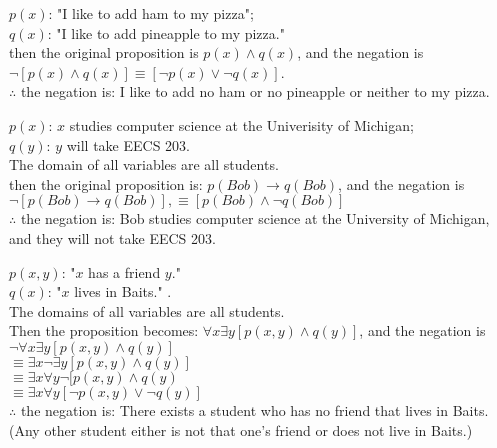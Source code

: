 \documentclass[12pt]{exam}
\begin{document}
\begin{solution}
\begin{qparts}
    \item 
 $p(x)$: "I like to add ham to my pizza"; \\$q(x)$: "I like to add pineapple to my pizza."\\
    then the original proposition is $p(x) \land q(x)$, and the negation is $\lnot [p(x) \land q(x)] \equiv [\lnot p(x) \lor \lnot q(x)]$. \\
    $\therefore$ the negation is: I like to add no ham or no pineapple or neither to my pizza.

    \item
    $p(x)$: $x$ studies computer science at the Univerisity of Michigan;\\
    $q(y)$: $y$ will take EECS 203. \\
    The domain of all variables are all students. \\
    then the original proposition is: $p(Bob) \rightarrow q(Bob)$, and the negation is $\lnot [p(Bob) \rightarrow q(Bob)], \equiv [p(Bob) \land \lnot q(Bob)]$
\\$\therefore$ the negation is: Bob studies computer science at the University of Michigan, and they will not take EECS 203.
    

    \item $p(x,y)$: "$x$ has a friend $y$."\\
   $q(x)$: "$x$ lives in Baits." .\\
   The domains of all variables are all students.\\
   Then the proposition becomes: 
   $\forall x \exists y [p(x,y) \land q(y)]$, and the negation is $\lnot \forall x \exists y [p(x,y) \land q(y)]$ \\
   $\equiv \exists x \lnot \exists y [p(x,y) \land q(y)]$ \\
   $\equiv \exists x \forall y \lnot [p(x,y) \land q(y)$ \\
   $\equiv \exists x \forall  y [\lnot p(x,y) \lor \lnot q(y) ]$ 
   \\$\therefore$ the negation is: There exists a student who has no friend that lives in Baits. \\
   (Any other student either is not that one's friend or does not live in Baits.)
   
\end{qparts}
\end{solution}
\end{document}
